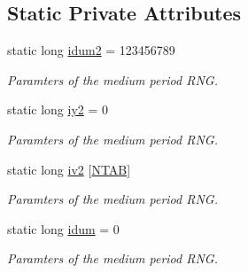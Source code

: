 \subsection*{Static Private Attributes}
\begin{DoxyCompactItemize}
\item 
static long \hyperlink{class_c_medium_period_r_n_g_a15dda956071d7e8874502761029e37ed}{idum2} = 123456789
\begin{DoxyCompactList}\small\item\em Paramters of the medium period R\-N\-G. \end{DoxyCompactList}\item 
static long \hyperlink{class_c_medium_period_r_n_g_a1da6d94f9e9e3fe4b83f9a6ae3c81825}{iy2} = 0
\begin{DoxyCompactList}\small\item\em Paramters of the medium period R\-N\-G. \end{DoxyCompactList}\item 
static long \hyperlink{class_c_medium_period_r_n_g_ad6be479584d3d21455f253a8254221c4}{iv2} \mbox{[}\hyperlink{_random_generators_8h_a0e93cfb2d62849853fd34957ba6e6fdc}{N\-T\-A\-B}\mbox{]}
\begin{DoxyCompactList}\small\item\em Paramters of the medium period R\-N\-G. \end{DoxyCompactList}\item 
static long \hyperlink{class_c_medium_period_r_n_g_aae9ed6044330aabad8e3571ac483800d}{idum} = 0
\begin{DoxyCompactList}\small\item\em Paramters of the medium period R\-N\-G. \end{DoxyCompactList}\end{DoxyCompactItemize}


